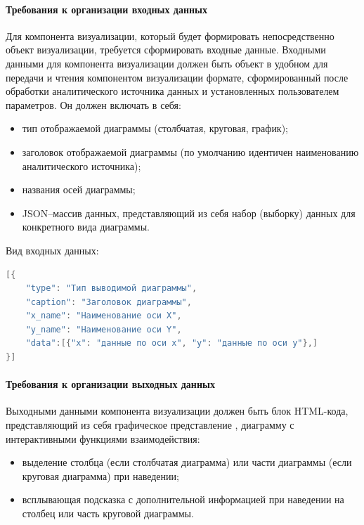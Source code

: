 \documentclass[a4paper]{extarticle}
\numberwithin{equation}{section}
\begin{document}
\paragraph{Требования к организации входных данных}
Для компонента визуализации, который будет формировать непосредственно объект визуализации, требуется сформировать входные данные. Входными данными для компонента визуализации должен быть объект в удобном для передачи и чтения компонентом визуализации формате, сформированный после обработки аналитического источника данных и установленных пользователем параметров. Он должен включать в себя:\par
\begin{itemize}
  \item тип отображаемой диаграммы (столбчатая, круговая, график);
  \item заголовок отображаемой диаграммы (по умолчанию идентичен наименованию аналитического источника);
  \item названия осей диаграммы;
  \item JSON–массив данных, представляющий из себя набор (выборку) данных для конкретного вида диаграммы.
\end{itemize}\par
Вид входных данных:\par
\lstset{inputencoding=utf8, extendedchars=\true, commentstyle=\itshape}
\begin{lstlisting}[language=Java]
[{
	"type": "Тип выводимой диаграммы",
	"caption": "Заголовок диаграммы",
	"x_name": "Наименование оси X",
	"y_name": "Наименование оси Y",
	"data":[{"x": "данные по оси x", "y": "данные по оси y"},]
}]
\end{lstlisting}

\paragraph{Требования к организации выходных данных}
Выходными данными компонента визуализации должен быть блок HTML-кода, представляющий из себя графическое представление , диаграмму с интерактивными функциями взаимодействия:
\begin{itemize}
  \item выделение столбца (если столбчатая диаграмма) или части диаграммы (если круговая диаграмма) при наведении;
  \item всплывающая подсказка с дополнительной информацией при наведении на столбец или часть круговой диаграммы.
\end{itemize}
\end{document}

